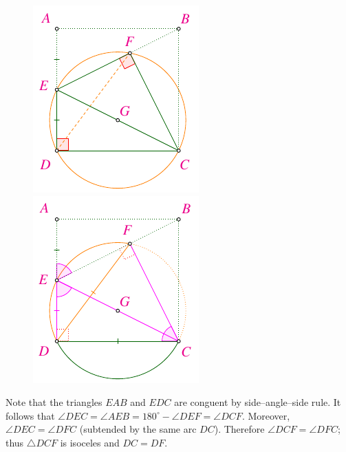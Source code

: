 \begin{multicols}{2}
	\begin{figure}[H]
		\vspace*{-10pt}
		\centering
		\captionsetup{labelformat= empty, justification=centering}
		\includegraphics[width= 0.65\linewidth]{2022-2-ms-1-1-f.pdf}
		\captionsetup{labelformat= empty, justification=centering}
		\includegraphics[width= 0.65\linewidth]{2022-2-ms-1-1-g.pdf}
		\vspace*{-5pt}
	\end{figure}	
	Note that the triangles $EAB$ and $EDC$ are conguent by side--angle--side rule. It follows that $\angle DEC= \angle AEB =180^{\circ} - \angle DEF = \angle DCF$. Moreover, $\angle DEC = \angle DFC$ (subtended by the same arc $DC$). Therefore $\angle DCF= \angle DFC$; thus $\triangle DCF$ is isoceles and $DC=DF$.

\end{multicols}
